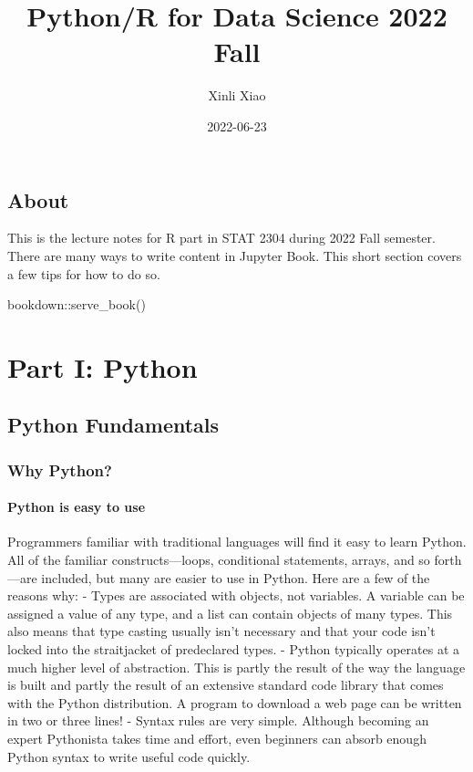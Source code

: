 \documentclass[
]{book}
\title{Python/R for Data Science 2022 Fall}
\author{Xinli Xiao}
\date{2022-06-23}
\newenvironment{Shaded}{\begin{snugshade}}{\end{snugshade}}
\newcommand{\FunctionTok}[1]{\textcolor[rgb]{0.00,0.00,0.00}{#1}}
\newcommand{\NormalTok}[1]{#1}
\newcommand{\SpecialCharTok}[1]{\textcolor[rgb]{0.00,0.00,0.00}{#1}}
\begin{document}
\maketitle

{
\setcounter{tocdepth}{1}
\tableofcontents
}
\hypertarget{about}{%
\chapter*{About}\label{about}}

This is the lecture notes for R part in STAT 2304 during 2022 Fall semester.
There are many ways to write content in Jupyter Book. This short section
covers a few tips for how to do so.

\begin{Shaded}
\begin{Highlighting}[]
\NormalTok{bookdown}\SpecialCharTok{::}\FunctionTok{serve\_book}\NormalTok{()}
\end{Highlighting}
\end{Shaded}

\hypertarget{part-part-i-python}{%
\part*{Part I: Python}\label{part-part-i-python}}

\hypertarget{python-fundamentals}{%
\chapter{Python Fundamentals}\label{python-fundamentals}}

\hypertarget{why-python}{%
\section{Why Python?}\label{why-python}}

\hypertarget{python-is-easy-to-use}{%
\subsection{Python is easy to use}\label{python-is-easy-to-use}}

Programmers familiar with traditional languages will find it easy to learn Python. All of the familiar constructs---loops, conditional statements, arrays, and so forth---are included, but many are easier to use in Python. Here are a few of the reasons why:
- Types are associated with objects, not variables. A variable can be assigned a value of any type, and a list can contain objects of many types. This also means that type casting usually isn't necessary and that your code isn't locked into the straitjacket of predeclared types.
- Python typically operates at a much higher level of abstraction. This is partly the result of the way the language is built and partly the result of an extensive standard code library that comes with the Python distribution. A program to download a web page can be written in two or three lines!
- Syntax rules are very simple. Although becoming an expert Pythonista takes time
and effort, even beginners can absorb enough Python syntax to write useful
code quickly.
\end{document}
